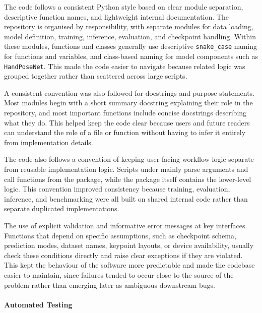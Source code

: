 ﻿\documentclass[11pt,a4paper]{article}
\begin{document}
The code follows a consistent Python style based on clear module separation,
descriptive function names, and lightweight internal documentation. The
repository is organised by responsibility, with separate modules for data
loading, model definition, training, inference, evaluation, and checkpoint
handling. Within these modules, functions and classes generally use
descriptive \texttt{snake\_case} naming for functions and variables, and
class-based naming for model components such as \texttt{HandPoseNet}. This
made the code easier to navigate because related logic was grouped together
rather than scattered across large scripts.

\medskip

\noindent
A consistent convention was also followed for docstrings and purpose
statements. Most modules begin with a short summary docstring explaining
their role in the repository, and most important functions include concise
docstrings describing what they do. This helped keep the code clear because
users and future readers can understand the role of a file or function
without having to infer it entirely from implementation details.

\medskip

\noindent
The code also follows a convention of keeping user-facing workflow logic
separate from reusable implementation logic. Scripts under 
mainly parse arguments and call functions from the 
package, while the package itself contains the lower-level logic. This
convention improved consistency because training, evaluation, inference, and
benchmarking were all built on shared internal code rather than separate
duplicated implementations.

\medskip

\noindent
The use of explicit validation and informative error messages at key
interfaces. Functions that depend on specific assumptions, such as checkpoint
schema, prediction modes, dataset names, keypoint layouts, or device
availability, usually check these conditions directly and raise clear
exceptions if they are violated. This kept the behaviour of the software more
predictable and made the codebase easier to maintain, since failures tended to
occur close to the source of the problem rather than emerging later as
ambiguous downstream bugs.

\paragraph*{Automated Testing}
\end{document}
